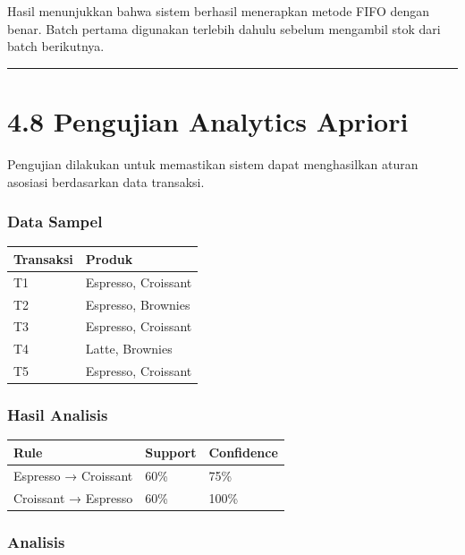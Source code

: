 Hasil menunjukkan bahwa sistem berhasil menerapkan metode FIFO dengan benar. Batch pertama digunakan terlebih dahulu sebelum mengambil stok dari batch berikutnya.

\begin{center}\rule{0.5\linewidth}{0.5pt}\end{center}

\section{4.8 Pengujian Analytics Apriori}\label{pengujian-analytics-apriori}

Pengujian dilakukan untuk memastikan sistem dapat menghasilkan aturan asosiasi berdasarkan data transaksi.

\subsubsection{Data Sampel}\label{data-sampel}

{\def\LTcaptype{none} %
\begin{longtable}[]{@{}ll@{}}
\toprule\noalign{}
Transaksi & Produk \\
\midrule\noalign{}
\endhead
\bottomrule\noalign{}
\endlastfoot
T1 & Espresso, Croissant \\
T2 & Espresso, Brownies \\
T3 & Espresso, Croissant \\
T4 & Latte, Brownies \\
T5 & Espresso, Croissant \\
\end{longtable}
}

\subsubsection{Hasil Analisis}\label{hasil-analisis}

{\def\LTcaptype{none} %
\begin{longtable}[]{@{}lll@{}}
\toprule\noalign{}
Rule & Support & Confidence \\
\midrule\noalign{}
\endhead
\bottomrule\noalign{}
\endlastfoot
Espresso → Croissant & 60\% & 75\% \\
Croissant → Espresso & 60\% & 100\% \\
\end{longtable}
}

\subsubsection{Analisis}\label{analisis-1}

